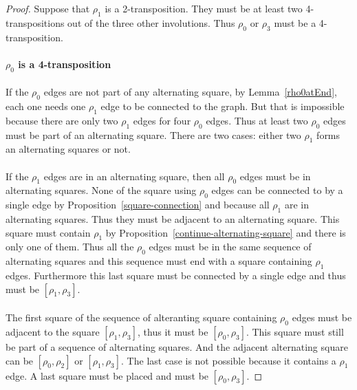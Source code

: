 \begin{proof}
  Suppose that $\rho_1$ is a 2-transposition. They must be at least two 4-transpositions out of the three other involutions. Thus $\rho_0$ or $\rho_3$ must be a 4-transposition.

  \paragraph{}
  \textbf{$\rho_0$ is a 4-transposition}

  \paragraph{}
  If the $\rho_0$ edges are not part of any alternating square, by Lemma~\ref{rho0atEnd}, each one needs one $\rho_1$ edge to be connected to the graph. But that is impossible because there are only two $\rho_1$ edges for four $\rho_0$ edges. Thus at least two $\rho_0$ edges must be part of an alternating square. There are two cases: either two $\rho_1$ forms an alternating squares or not.

  \paragraph{}
  If the $\rho_1$ edges are in an alternating square, then all $\rho_0$ edges must be in alternating squares. None of the square using $\rho_0$ edges can be connected to by a single edge by Proposition~\ref{square-connection} and because all $\rho_1$ are in alternating squares. Thus they must be adjacent to an alternating square. This square must contain $\rho_1$ by Proposition~\ref{continue-alternating-square} and there is only one of them. Thus all the $\rho_0$ edges must be in the same sequence of alternating squares and this sequence must end with a square containing $\rho_1$ edges. Furthermore this last square must be connected by a single edge and thus must be $[\rho_1, \rho_3]$.

  \paragraph{}
  The first square of the sequence of alteranting square containing $\rho_0$ edges must be adjacent to the square $[\rho_1, \rho_3]$, thus it must be $[\rho_0, \rho_3]$. This square must still be part of a sequence of alternating squares. And the adjacent alternating square can be $[\rho_0, \rho_2]$ or $[\rho_1, \rho_3]$. The last case is not possible because it contains a $\rho_1$ edge. A last square must be placed and must be $[\rho_0, \rho_3]$.



\end{proof}
